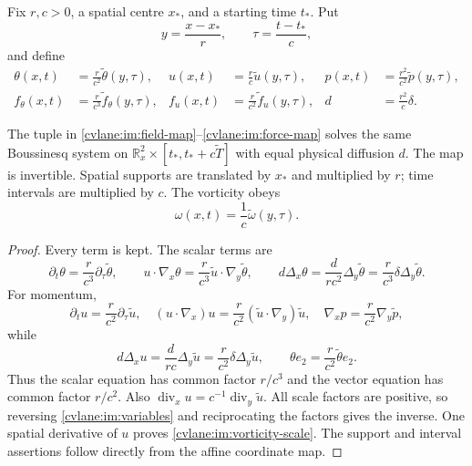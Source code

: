 Fix $r,c>0$, a spatial centre $x_*$, and a starting time $t_*$.  Put
\begin{equation}\label{cvlane:im:variables}
 y=\frac{x-x_*}{r},\qquad
 \tau=\frac{t-t_*}{c},
\end{equation}
and define
\begin{align}
 \theta(x,t)&=\frac{r}{c^2}\widetilde\theta(y,\tau),&
 u(x,t)&=\frac{r}{c}\widetilde u(y,\tau),&
 p(x,t)&=\frac{r^2}{c^2}\widetilde p(y,\tau),
 \label{cvlane:im:field-map}\\
 f_\theta(x,t)&=\frac{r}{c^3}\widetilde f_\theta(y,\tau),&
 f_u(x,t)&=\frac{r}{c^2}\widetilde f_u(y,\tau),&
 d&=\frac{r^2}{c}\delta .
 \label{cvlane:im:force-map}
\end{align}

\begin{cvlaneproposition}\label{cvlane:im:similarity}
The tuple in \eqref{cvlane:im:field-map}--\eqref{cvlane:im:force-map} solves the same
Boussinesq system on
$\mathbb R^2_x\times[t_*,t_*+c\widetilde T]$ with equal physical
diffusion $d$.  The map is invertible.  Spatial supports are translated
by $x_*$ and multiplied by $r$; time intervals are multiplied by $c$.
The vorticity obeys
\begin{equation}\label{cvlane:im:vorticity-scale}
 \omega(x,t)=\frac1c\widetilde\omega(y,\tau).
\end{equation}
\end{cvlaneproposition}

\begin{proof}
Every term is kept.  The scalar terms are
\[
 \partial_t\theta=\frac r{c^3}\partial_\tau\widetilde\theta,\qquad
 u\cdot\nabla_x\theta
 =\frac r{c^3}\widetilde u\cdot\nabla_y\widetilde\theta,\qquad
 d\Delta_x\theta
 =\frac{d}{rc^2}\Delta_y\widetilde\theta
 =\frac r{c^3}\delta\Delta_y\widetilde\theta.
\]
For momentum,
\[
 \partial_tu=\frac r{c^2}\partial_\tau\widetilde u,\quad
 (u\cdot\nabla_x)u=\frac r{c^2}
       (\widetilde u\cdot\nabla_y)\widetilde u,\quad
 \nabla_xp=\frac r{c^2}\nabla_y\widetilde p,
\]
while
\[
 d\Delta_xu=\frac d{rc}\Delta_y\widetilde u
 =\frac r{c^2}\delta\Delta_y\widetilde u,\qquad
 \theta e_2=\frac r{c^2}\widetilde\theta e_2.
\]
Thus the scalar equation has common factor $r/c^3$ and the vector
equation has common factor $r/c^2$.  Also
$\operatorname{div}_xu=c^{-1}\operatorname{div}_y\widetilde u$.
All scale factors are positive, so reversing
\eqref{cvlane:im:variables} and reciprocating the factors gives the inverse.
One spatial derivative of $u$ proves \eqref{cvlane:im:vorticity-scale}.
The support and interval assertions follow directly from the affine
coordinate map.
\end{proof}


